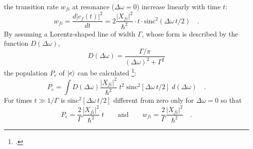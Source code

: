 the transition rate $w_{fi}$ at resonance ($\Delta \omega =
0$) increase linearly with time $t$:
\begin{equation}
 w_{fi} = \frac{d |c_f(t)|^2}{dt} = 2 \frac{|X_{fi}|^2}{\hbar^2} \cdot t \cdot
\text{sinc}^2(\Delta \omega \,t / 2) \quad .
\end{equation}
By assuming a Lorentz-shaped line of width $\Gamma$, whose
form is described by the function $D(\Delta \omega)$,
\begin{equation}
D(\Delta \omega) = \frac{\Gamma / \pi}{(\Delta \omega)^2 +
\Gamma^2}
\end{equation}
the population $P_e$ of $\ket{e}$ can be calculated 
\footcite{mystre_quantum_optics}:
\begin{equation}
P_e = \int D(\Delta \omega) \frac{|X_{fi}|^2}{\hbar^2} \; t^2 \;
\text{sinc}^2\left[ \Delta \omega  \,t / 2 \right] \; d (\Delta
\omega) \quad .
\end{equation}
For times $t \gg 1 / \Gamma$ is $\text{sinc}^2\left[ \Delta
\omega \,t / 2 \right]$ different from zero only for $\Delta \omega = 0$  so that
\begin{equation}
P_e =  \frac{2}{ \Gamma} \frac{|X_{fi}|^2}{ \hbar^2} \; t \qquad
\text{and} \qquad w_{fi} =  \frac{2}{ \Gamma} \frac{|X_{fi}|^2}{
\hbar^2} \quad .
\end{equation}

